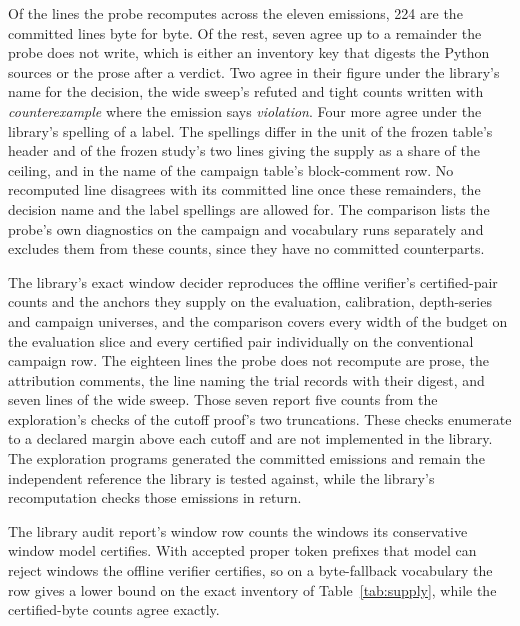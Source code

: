 \documentclass[11pt,a4paper]{article}
\theoremstyle{definition}
\theoremstyle{plain}
\begin{document}
Of the lines the probe recomputes across the eleven emissions, 224 are the committed lines byte for byte. Of the rest,
seven agree up to a remainder the probe does not write, which is either an inventory key that digests the Python sources
or the prose after a verdict. Two agree in their figure under the library's name for the decision, the wide sweep's
refuted and tight counts written with \emph{counterexample} where the emission says \emph{violation}. Four more agree
under the library's spelling of a label. The spellings differ in the unit of the frozen table's header and of the frozen
study's two lines giving the supply as a share of the ceiling, and in the name of the campaign table's block-comment
row. No recomputed line disagrees with its committed line once these remainders, the decision name and the label
spellings are allowed for. The comparison lists the probe's own diagnostics on the campaign and vocabulary runs
separately and excludes them from these counts, since they have no committed counterparts.

The library's exact window decider reproduces the offline verifier's certified-pair counts and the anchors they supply
on the evaluation, calibration, depth-series and campaign universes, and the comparison covers every width of the budget
on the evaluation slice and every certified pair individually on the conventional campaign row. The eighteen lines the
probe does not recompute are prose, the attribution comments, the line naming the trial records with their digest, and
seven lines of the wide sweep. Those seven report five counts from the exploration's checks of the cutoff proof's two
truncations. These checks enumerate to a declared margin above each cutoff and are not implemented in the library. The
exploration programs generated the committed emissions and remain the independent reference the library is tested
against, while the library's recomputation checks those emissions in return.

The library audit report's window row counts the windows its conservative window model certifies. With accepted proper
token prefixes that model can reject windows the offline verifier certifies, so on a byte-fallback vocabulary the row
gives a lower bound on the exact inventory of Table~\ref{tab:supply}, while the certified-byte counts agree exactly.

\setlength{\bibsep}{1pt}


\end{document}
